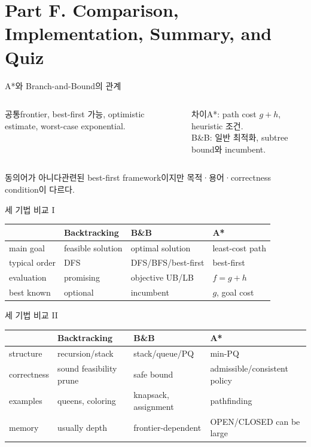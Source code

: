 \section{Part F. Comparison, Implementation, Summary, and Quiz}
\begin{frame}{A*와 Branch-and-Bound의 관계}
\begin{columns}[T]
\begin{block}{공통}frontier, best-first 가능, optimistic estimate, worst-case exponential.\end{block}
\begin{block}{차이}A*: path cost \(g+h\), heuristic 조건.\\B\&B: 일반 최적화, subtree bound와 incumbent.\end{block}
\end{columns}
\begin{alertblock}{동의어가 아니다}관련된 best-first framework이지만 목적·용어·correctness condition이 다르다.\end{alertblock}
\end{frame}
\begin{frame}{세 기법 비교 I}
\small
\begin{tabular}{L{2.0cm}L{3.2cm}L{3.2cm}L{3.2cm}}\toprule
&Backtracking&B\&B&A*\\\midrule
main goal&feasible solution&optimal solution&least-cost path\\
typical order&DFS&DFS/BFS/best-first&best-first\\
evaluation&promising&objective UB/LB&\(f=g+h\)\\
best known&optional&incumbent&\(g\), goal cost\\\bottomrule
\end{tabular}
\end{frame}
\begin{frame}{세 기법 비교 II}
\small
\begin{tabular}{L{2.0cm}L{3.2cm}L{3.2cm}L{3.2cm}}\toprule
&Backtracking&B\&B&A*\\\midrule
structure&recursion/stack&stack/queue/PQ&min-PQ\\
correctness&sound feasibility prune&safe bound&admissible/consistent policy\\
examples&queens, coloring&knapsack, assignment&pathfinding\\
memory&usually depth&frontier-dependent&OPEN/CLOSED can be large\\\bottomrule
\end{tabular}
\end{frame}
